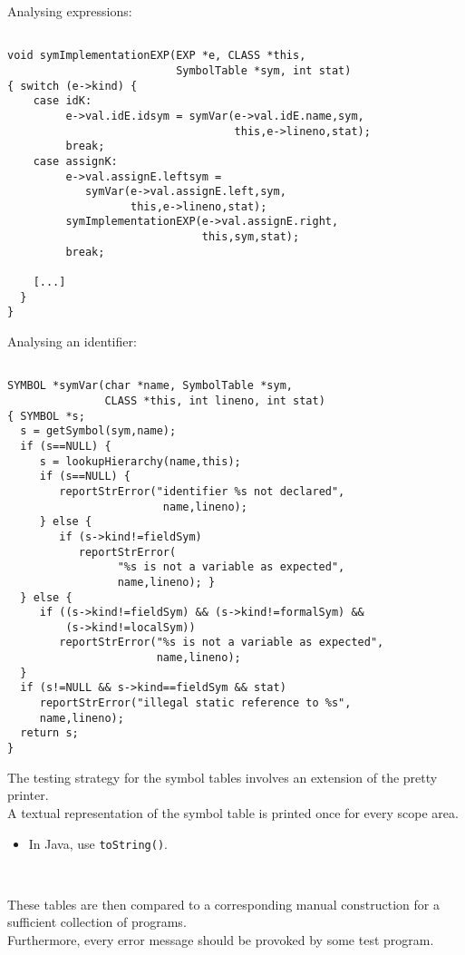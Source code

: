 \begin{slide*}
Analysing expressions:

\begin{scriptsize}
\begin{verbatim}

void symImplementationEXP(EXP *e, CLASS *this,
                          SymbolTable *sym, int stat)
{ switch (e->kind) {
    case idK:
         e->val.idE.idsym = symVar(e->val.idE.name,sym,
                                   this,e->lineno,stat);
         break;
    case assignK:
         e->val.assignE.leftsym = 
            symVar(e->val.assignE.left,sym,
                   this,e->lineno,stat);
         symImplementationEXP(e->val.assignE.right,
                              this,sym,stat);
         break;

    [...]
  }
}
\end{verbatim}
\end{scriptsize}
\vfil
\end{slide*}
 
\begin{slide*}
Analysing an identifier:

\begin{scriptsize}
\begin{verbatim}

SYMBOL *symVar(char *name, SymbolTable *sym, 
               CLASS *this, int lineno, int stat)
{ SYMBOL *s;
  s = getSymbol(sym,name);
  if (s==NULL) {
     s = lookupHierarchy(name,this);
     if (s==NULL) {
        reportStrError("identifier %s not declared",
                        name,lineno);
     } else {
        if (s->kind!=fieldSym) 
           reportStrError(
                 "%s is not a variable as expected",
                 name,lineno); }
  } else {
     if ((s->kind!=fieldSym) && (s->kind!=formalSym) && 
         (s->kind!=localSym))
        reportStrError("%s is not a variable as expected",
                       name,lineno);
  }
  if (s!=NULL && s->kind==fieldSym && stat) 
     reportStrError("illegal static reference to %s",
     name,lineno);
  return s;
}
\end{verbatim}
\end{scriptsize}
\vfil
\end{slide*}
 
\begin{slide*}
The testing strategy for the symbol tables involves an extension of the
pretty printer.\\

A textual representation of the symbol table is printed once for every 
scope area.

\begin{itemize}
  \item In Java, use {\tt toString()}.
\end{itemize}
~

These tables are then compared to a corresponding manual construction for a sufficient
collection of programs.\\

Furthermore, every error message should be provoked by some test program.
\vfil
\end{slide*}
 

